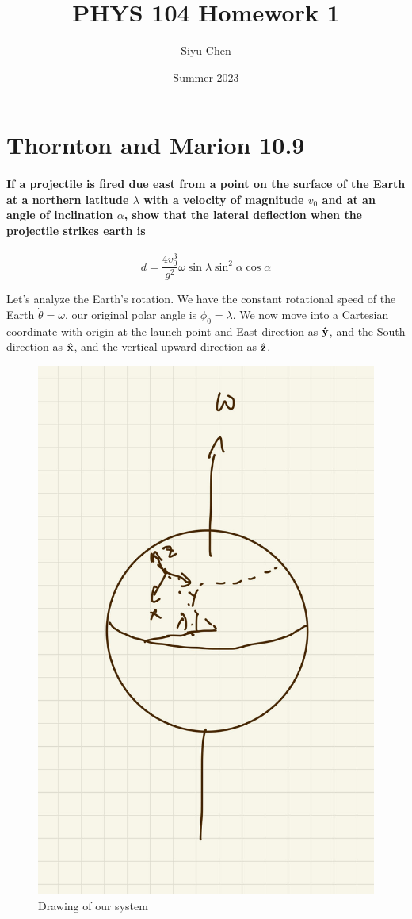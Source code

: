 \documentclass{article}
\title{PHYS 104 Homework 1}
\author{Siyu Chen}
\date{Summer 2023}
\numberwithin{equation}{section}
\newcommand{\vbh}[1]{\vb{\hat{#1}}}
\begin{document}
\maketitle

\section{Thornton and Marion 10.9}

\paragraph{If a projectile is fired due east from a point on the surface of the Earth at a northern latitude $\lambda$ with a velocity of magnitude $v_0$ and at an angle of inclination $\alpha$, show that the lateral deflection when the projectile strikes earth is}


\begin{equation*}
    d = \frac{4 v^3_0}{g^2} \omega \sin \lambda \sin^2 \alpha \cos \alpha
\end{equation*}

Let's analyze the Earth's rotation. We have the constant rotational speed of the Earth $\dot{\theta} = \omega$, our original polar angle is $\phi_0 = \lambda$. We now move into a Cartesian coordinate with origin at the launch point and East direction as $\vbh{y}$, and the South direction as $\vbh{x}$, and the vertical upward direction as $\vbh{z}$. 

\begin{figure}[!htb]
\centering
   \begin{minipage}{0.48\textwidth}
     \includegraphics[width=.7\linewidth]{hw/hw1/1.1.jpg}
     \caption{Drawing of our system}
   \end{minipage}\hfill
\end{figure}
\end{document}
